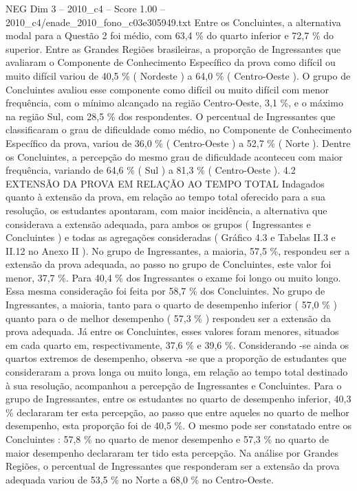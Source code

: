 \begin{textsample}{NEG Dim 3 – 2010\_c4 – Score 1.00 – 2010\_c4/enade\_2010\_fono\_c03e305949.txt}
Entre os Concluintes, a alternativa modal para a Questão 2 foi médio, com 63,4 \% do quarto inferior e 72,7 \% do superior.
Entre as Grandes Regiões brasileiras, a proporção de Ingressantes que avaliaram o Componente de Conhecimento Específico da prova como difícil ou muito difícil variou de 40,5 \% ( Nordeste ) a 64,0 \% ( Centro-Oeste ).
O grupo de Concluintes avaliou esse componente como difícil ou muito difícil com menor frequência, com o mínimo alcançado na região Centro-Oeste, 3,1 \%, e o máximo na região Sul, com 28,5 \% dos respondentes.
O percentual de Ingressantes que classificaram o grau de dificuldade como médio, no Componente de Conhecimento Específico da prova, variou de 36,0 \% ( Centro-Oeste ) a 52,7 \% ( Norte ).
Dentre os Concluintes, a percepção do mesmo grau de dificuldade aconteceu com maior frequência, variando de 64,6 \% ( Sul ) a 81,3 \% ( Centro-Oeste ). 4.2 EXTENSÃO DA PROVA EM RELAÇÃO AO TEMPO TOTAL Indagados quanto à extensão da prova, em relação ao tempo total oferecido para a sua resolução, os estudantes apontaram, com maior incidência, a alternativa que considerava a extensão adequada, para ambos os grupos ( Ingressantes e Concluintes ) e todas as agregações consideradas ( Gráfico 4.3 e Tabelas II.3 e II.12 no Anexo II ).
No grupo de Ingressantes, a maioria, 57,5 \%, respondeu ser a extensão da prova adequada, ao passo no grupo de Concluintes, este valor foi menor, 37,7 \%.
Para 40,4 \% dos Ingressantes o exame foi longo ou muito longo.
Essa mesma consideração foi feita por 58,7 \% dos Concluintes.
No grupo de Ingressantes, a maioria, tanto para o quarto de desempenho inferior ( 57,0 \% ) quanto para o de melhor desempenho ( 57,3 \% ) respondeu ser a extensão da prova adequada.
Já entre os Concluintes, esses valores foram menores, situados em cada quarto em, respectivamente, 37,6 \% e 39,6 \%.
Considerando -se ainda os quartos extremos de desempenho, observa -se que a proporção de estudantes que consideraram a prova longa ou muito longa, em relação ao tempo total destinado à sua resolução, acompanhou a percepção de Ingressantes e Concluintes.
Para o grupo de Ingressantes, entre os estudantes no quarto de desempenho inferior, 40,3 \% declararam ter esta percepção, ao passo que entre aqueles no quarto de melhor desempenho, esta proporção foi de 40,5 \%.
O mesmo pode ser constatado entre os Concluintes : 57,8 \% no quarto de menor desempenho e 57,3 \% no quarto de maior desempenho declararam ter tido esta percepção.
Na análise por Grandes Regiões, o percentual de Ingressantes que responderam ser a extensão da prova adequada variou de 53,5 \% no Norte a 68,0 \% no Centro-Oeste.

\end{textsample}
